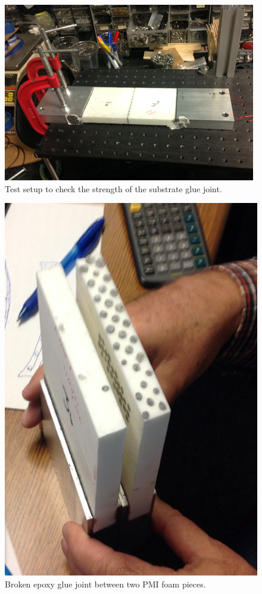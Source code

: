 \begin{figure}[ht]
    \centering
    \includegraphics[width=0.95\linewidth]{images/Glue_joint_test.png}
    \caption{Test setup to check the strength of the substrate glue joint.}
    \label{fig:Glue_joint_test}
\end{figure}

\begin{figure}[ht]
    \centering
    \includegraphics[width=1.0\linewidth]{images/Broken.png}
    \caption{Broken epoxy glue joint between two PMI foam pieces.}
    \label{fig:Broken}
\end{figure}

